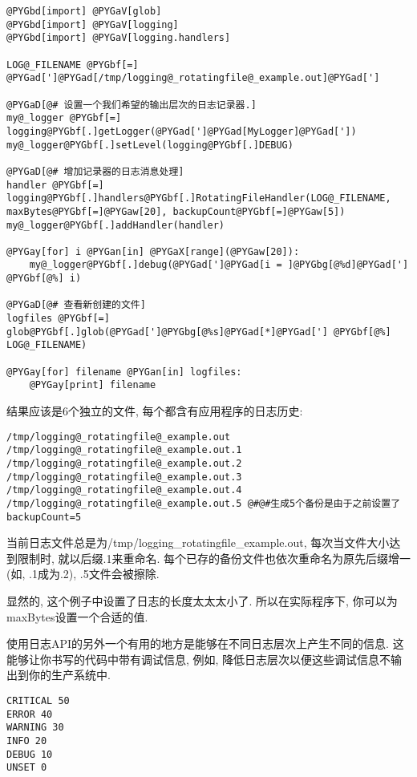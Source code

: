 \documentclass[letterpaper,10pt,english]{manual}
\begin{document}
\begin{Verbatim}[commandchars=@\[\]]
@PYGbd[import] @PYGaV[glob]
@PYGbd[import] @PYGaV[logging]
@PYGbd[import] @PYGaV[logging.handlers]

LOG@_FILENAME @PYGbf[=] @PYGad[']@PYGad[/tmp/logging@_rotatingfile@_example.out]@PYGad[']

@PYGaD[@# 设置一个我们希望的输出层次的日志记录器.]
my@_logger @PYGbf[=] logging@PYGbf[.]getLogger(@PYGad[']@PYGad[MyLogger]@PYGad['])
my@_logger@PYGbf[.]setLevel(logging@PYGbf[.]DEBUG)

@PYGaD[@# 增加记录器的日志消息处理]
handler @PYGbf[=] logging@PYGbf[.]handlers@PYGbf[.]RotatingFileHandler(LOG@_FILENAME, maxBytes@PYGbf[=]@PYGaw[20], backupCount@PYGbf[=]@PYGaw[5])
my@_logger@PYGbf[.]addHandler(handler)

@PYGay[for] i @PYGan[in] @PYGaX[range](@PYGaw[20]):
    my@_logger@PYGbf[.]debug(@PYGad[']@PYGad[i = ]@PYGbg[@%d]@PYGad['] @PYGbf[@%] i)

@PYGaD[@# 查看新创建的文件]
logfiles @PYGbf[=] glob@PYGbf[.]glob(@PYGad[']@PYGbg[@%s]@PYGad[*]@PYGad['] @PYGbf[@%] LOG@_FILENAME)

@PYGay[for] filename @PYGan[in] logfiles:
    @PYGay[print] filename
\end{Verbatim}

结果应该是6个独立的文件, 每个都含有应用程序的日志历史:

\begin{Verbatim}[commandchars=@\[\]]
/tmp/logging@_rotatingfile@_example.out
/tmp/logging@_rotatingfile@_example.out.1
/tmp/logging@_rotatingfile@_example.out.2
/tmp/logging@_rotatingfile@_example.out.3
/tmp/logging@_rotatingfile@_example.out.4
/tmp/logging@_rotatingfile@_example.out.5 @#@#生成5个备份是由于之前设置了backupCount=5
\end{Verbatim}

当前日志文件总是为/tmp/logging\_rotatingfile\_example.out, 每次当文件大小达到限制时, 就以后缀.1来重命名. 每个已存的备份文件也依次重命名为原先后缀增一(如, .1成为.2), .5文件会被擦除.

显然的, 这个例子中设置了日志的长度太太太小了. 所以在实际程序下, 你可以为maxBytes设置一个合适的值.

使用日志API的另外一个有用的地方是能够在不同日志层次上产生不同的信息. 这能够让你书写的代码中带有调试信息, 例如, 降低日志层次以便这些调试信息不输出到你的生产系统中.

\begin{Verbatim}[commandchars=@\[\]]
CRITICAL 50
ERROR 40
WARNING 30
INFO 20
DEBUG 10
UNSET 0
\end{Verbatim}
\end{document}
